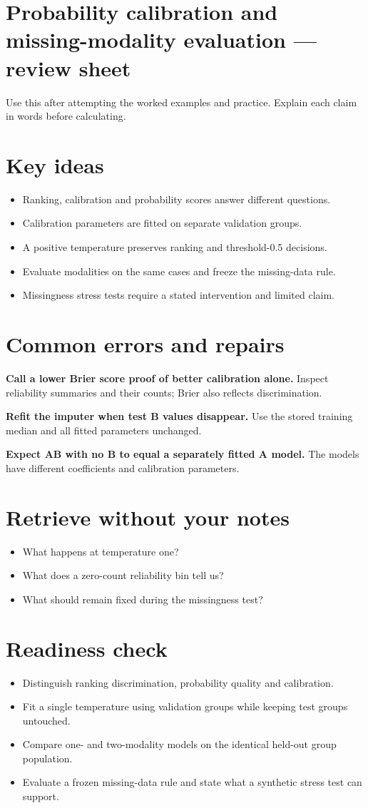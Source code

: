 \documentclass[11pt,letterpaper]{article}
\theoremstyle{definition}\newtheorem{definition}{Definition}\newtheorem{example}{Example}
\numberwithin{equation}{section}
\begin{document}
\section*{Probability calibration and missing-modality evaluation --- review sheet}
Use this after attempting the worked examples and practice. Explain each claim in words before calculating.

\section*{Key ideas}
\begin{itemize}
\item Ranking, calibration and probability scores answer different questions.
\item Calibration parameters are fitted on separate validation groups.
\item A positive temperature preserves ranking and threshold-0.5 decisions.
\item Evaluate modalities on the same cases and freeze the missing-data rule.
\item Missingness stress tests require a stated intervention and limited claim.
\end{itemize}
\section*{Common errors and repairs}
\textbf{Call a lower Brier score proof of better calibration alone.} Inspect reliability summaries and their counts; Brier also reflects discrimination.

\textbf{Refit the imputer when test B values disappear.} Use the stored training median and all fitted parameters unchanged.

\textbf{Expect AB with no B to equal a separately fitted A model.} The models have different coefficients and calibration parameters.

\section*{Retrieve without your notes}
\begin{itemize}
\item What happens at temperature one?
\item What does a zero-count reliability bin tell us?
\item What should remain fixed during the missingness test?
\end{itemize}
\section*{Readiness check}
\begin{itemize}
\item Distinguish ranking discrimination, probability quality and calibration.
\item Fit a single temperature using validation groups while keeping test groups untouched.
\item Compare one- and two-modality models on the identical held-out group population.
\item Evaluate a frozen missing-data rule and state what a synthetic stress test can support.
\end{itemize}
\end{document}
